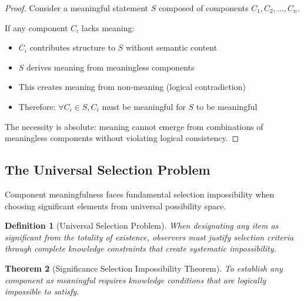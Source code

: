 \documentclass[12pt,a4paper]{article}
\newtheorem{theorem}{Theorem}[section]
\newtheorem{definition}[theorem]{Definition}
\begin{document}
\begin{proof}
Consider a meaningful statement $S$ composed of components $C_1, C_2, \ldots, C_n$.

If any component $C_i$ lacks meaning:
\begin{itemize}
\item $C_i$ contributes structure to $S$ without semantic content
\item $S$ derives meaning from meaningless components  
\item This creates meaning from non-meaning (logical contradiction)
\item Therefore: $\forall C_i \in S, C_i$ must be meaningful for $S$ to be meaningful
\end{itemize}

The necessity is absolute: meaning cannot emerge from combinations of meaningless components without violating logical consistency.
\end{proof}

\subsection{The Universal Selection Problem}

Component meaningfulness faces fundamental selection impossibility when choosing significant elements from universal possibility space.

\begin{definition}[Universal Selection Problem]
When designating any item as significant from the totality of existence, observers must justify selection criteria through complete knowledge constraints that create systematic impossibility.
\end{definition}

\begin{theorem}[Significance Selection Impossibility Theorem]
To establish any component as meaningful requires knowledge conditions that are logically impossible to satisfy.
\end{theorem}
\end{document}
